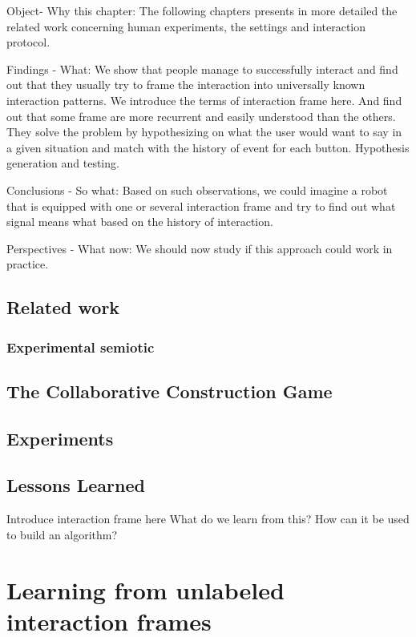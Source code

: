 Object- Why this chapter: The following chapters presents in more detailed the related work concerning human experiments, the settings and interaction protocol.

Findings - What: We show that people manage to successfully interact and find out that they usually try to frame the interaction into universally known interaction patterns. We introduce the terms of interaction frame here. And find out that some frame are more recurrent and easily understood than the others. They solve the problem by hypothesizing on what the user would want to say in a given situation and match with the history of event for each button. Hypothesis generation and testing.

Conclusions - So what: Based on such observations, we could imagine a robot that is equipped with one or several interaction frame and try to find out what signal means what based on the history of interaction.

Perspectives - What now: We should now study if this approach could work in practice.

\section{Related work}

\subsection{Experimental semiotic}

\section{The Collaborative Construction Game}

\section{Experiments}

\section{Lessons Learned} %

Introduce interaction frame here
What do we learn from this? 
How can it be used to build an algorithm?

\chapter{Learning from unlabeled interaction frames}
\minitoc

